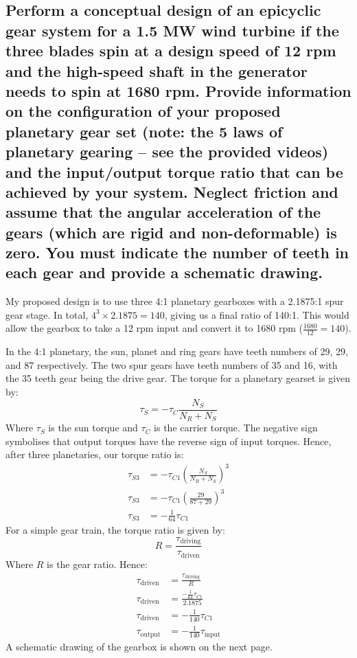 \documentclass[12pt]{article}
\numberwithin{equation}{section}
\begin{document}
\begin{flushleft}
\subsection[Schematic.]{Perform a conceptual design of an epicyclic gear system for a 1.5 MW wind turbine if the three blades spin at a design speed of 12 rpm and the high-speed shaft in the generator needs to spin at 1680 rpm. Provide information on the configuration of your proposed planetary gear set (note: the 5 laws of planetary gearing – see the provided videos) and the input/output torque ratio that can be achieved by your system. Neglect friction and assume that the angular acceleration of the gears (which are rigid and non-deformable) is zero. You must indicate the number of teeth in each gear and provide a schematic drawing.}
My proposed design is to use three 4:1 planetary gearboxes with a 2.1875:1 spur gear stage. In total, $4^3 \times 2.1875 = 140$, giving us a final ratio of 140:1. This would allow the gearbox to take a 12 rpm input and convert it to 1680 rpm ($\frac{1680}{12} = 140$).

In the 4:1 planetary, the sun, planet and ring gears have teeth numbers of 29, 29, and 87 respectively. The two spur gears have teeth numbers of 35 and 16, with the 35 teeth gear being the drive gear. The torque for a planetary gearset is given by:
\begin{equation}
  \tau_S = - \tau_C \frac{N_S}{N_R + N_S}
\end{equation}
Where $\tau_S$ is the sun torque and $\tau_C$ is the carrier torque. The negative sign symbolises that output torques have the reverse sign of input torques.
Hence, after three planetaries, our torque ratio is:
\begin{align}
  \tau_{S3} &= - \tau_{C1} \left( \frac{N_S}{N_R + N_S} \right)^3\\
  \tau_{S3} &= - \tau_{C1} \left( \frac{29}{87 + 29} \right)^3\\
  \tau_{S3} &= - \frac{1}{64}\tau_{C1} 
\end{align}
For a simple gear train, the torque ratio is given by:
\begin{equation}
  R = \frac{\tau_{\textrm{driving}}}{\tau_{\textrm{driven}}}
\end{equation}
Where $R$ is the gear ratio. Hence:
\begin{align}
  \tau_{\textrm{driven}} &= \frac{\tau_{\textrm{driving}}}{R}\\
  \tau_{\textrm{driven}} &= \frac{- \frac{1}{64}\tau_{C1} }{2.1875}\\
  \tau_{\textrm{driven}} &= -\frac{1}{140} \tau_{C1}\\
  \tau_{\textrm{output}} &= -\frac{1}{140} \tau_{\textrm{input}}
\end{align}
A schematic drawing of the gearbox is shown on the next page.
\newpage

\end{flushleft}
\end{document}
